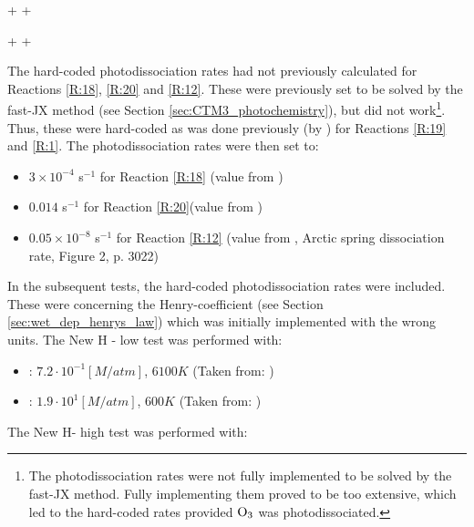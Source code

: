 \begin{reaction}
     +  \rightarrow {} + 
    \label{rqn:oh_br2}
\end{reaction}


\begin{reaction}
     +  \rightarrow {} + 
    \label{rqn:oh_hbr}
\end{reaction}

The hard-coded photodissociation rates had not previously calculated for Reactions \ref{R:18}, \ref{R:20} and \ref{R:12}. These were previously set to be solved by the fast-JX method (see Section \ref{sec:CTM3_photochemistry}), but did not work\footnote{The photodissociation rates were not fully implemented to be solved by the fast-JX method. Fully implementing them proved to be too extensive, which led to the hard-coded rates provided $\mathrm{O_3}$ was photodissociated.}. Thus, these were hard-coded as was done previously (by \cite{Susanne}) for Reactions \ref{R:19} and \ref{R:1}. The photodissociation rates were then set to: 

\begin{itemize}
    \item $3\times10^{-4}$ s$^{-1}$ for Reaction \ref{R:18} (value from \cite{CAO})
    \item $0.014$ s$^{-1}$ for Reaction \ref{R:20}(value from \cite{CAO})
    \item $0.05\times10^{-8}$ s$^{-1}$ for Reaction \ref{R:12} (value from \cite{Papanastasiou2013}, Arctic spring dissociation rate, Figure 2, p. 3022)
\end{itemize}



In the subsequent tests, the hard-coded photodissociation rates were included. These were concerning the Henry-coefficient (see Section \ref{sec:wet_dep_henrys_law}) which was initially implemented with the wrong units. The New H - low test was performed with: 


\begin{itemize}
    \item {}: $7.2\cdot 10^{-1} [M/atm]$, $6100 K$ (Taken from: \cite{Chameides1992})
    \item {}: $1.9\cdot10^1 [M/atm]$, $600 K$ (Taken from: \cite{dean1999})
\end{itemize}

The New H- high test was performed with:  


